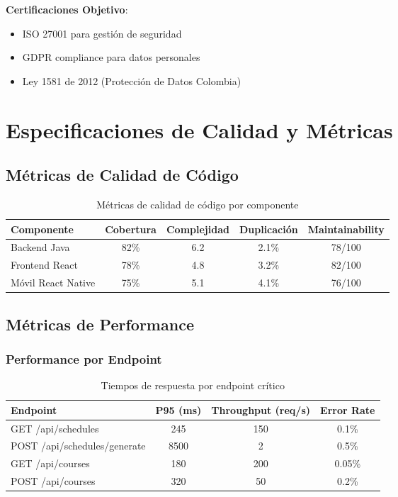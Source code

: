 \textbf{Certificaciones Objetivo}:
\begin{itemize}
\item ISO 27001 para gestión de seguridad
\item GDPR compliance para datos personales
\item Ley 1581 de 2012 (Protección de Datos Colombia)
\end{itemize}

\section{Especificaciones de Calidad y Métricas}

\subsection{Métricas de Calidad de Código}

\begin{table}[h]
\centering
\caption{Métricas de calidad de código por componente}
\label{tab:calidad_codigo}
\begin{tabular}{|l|c|c|c|c|}
\hline
\textbf{Componente} & \textbf{Cobertura} & \textbf{Complejidad} & \textbf{Duplicación} & \textbf{Maintainability} \\
\hline
Backend Java & 82\% & 6.2 & 2.1\% & 78/100 \\
\hline
Frontend React & 78\% & 4.8 & 3.2\% & 82/100 \\
\hline
Móvil React Native & 75\% & 5.1 & 4.1\% & 76/100 \\
\hline
\end{tabular}
\end{table}

\subsection{Métricas de Performance}

\subsubsection{Performance por Endpoint}

\begin{table}[h]
\centering
\caption{Tiempos de respuesta por endpoint crítico}
\label{tab:performance_endpoints}
\begin{tabular}{|l|c|c|c|}
\hline
\textbf{Endpoint} & \textbf{P95 (ms)} & \textbf{Throughput (req/s)} & \textbf{Error Rate} \\
\hline
GET /api/schedules & 245 & 150 & 0.1\% \\
\hline
POST /api/schedules/generate & 8500 & 2 & 0.5\% \\
\hline
GET /api/courses & 180 & 200 & 0.05\% \\
\hline
POST /api/courses & 320 & 50 & 0.2\% \\
\hline
\end{tabular}
\end{table}

